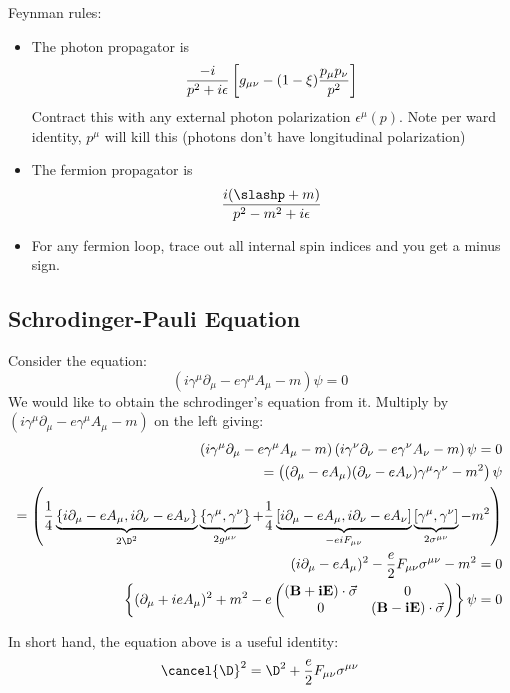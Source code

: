 \documentclass[11pt]{scrartcl}
\begin{document}
Feynman rules:
\begin{itemize}
\item The photon propagator is 
\[ {-i \over p^2 + i \epsilon} \left[g_{\mu \nu} - (1 - \xi){p_\mu p_\nu \over p^2} \right] \]
Contract this with any external photon polarization $ \epsilon^\mu(p)$.  Note per ward identity, $p^\mu$ will kill this (photons don't have longitudinal polarization)
\item The fermion propagator is
\[{i (\slashp + m) \over p^2 - m^2 + i \epsilon} \]
\item For any fermion loop, trace out all internal spin indices and you get a minus sign.
	\end{itemize}
\subsection{Schrodinger-Pauli Equation}
Consider the equation:
\[ \left(i \gamma^\mu \partial_\mu - e \gamma^\mu A_\mu - m\right) \psi = 0 \]
We would like to obtain the schrodinger's equation from it.
Multiply by $\left(i \gamma^\mu \partial_\mu - e \gamma^\mu A_\mu - m\right)$ on the left giving:
\begin{align}
\left(i \gamma^\mu \partial_\mu - e \gamma^\mu A_\mu - m\right) \left(i \gamma^\nu \partial_\nu - e \gamma^\nu A_\nu - m\right) \psi = 0 \\
 = \left((\partial_\mu - e A_\mu) (\partial_\nu - e A_\nu) \gamma^\mu \gamma^\nu - m^2 \right)  \psi \\
 = \left( \frac14 \underbrace{ \{ i \partial_\mu - e A_\mu, i\partial_\nu - e A_\nu \} }_{2 \D^2} \underbrace{\{\gamma^\mu, \gamma^\nu \}}_{2 g^{\mu \nu}}  + \frac14 \underbrace{[ i\partial_\mu - e A_\mu, i \partial_\nu - e A_\nu]}_{- ei F_{\mu \nu}} \underbrace{[\gamma^\mu, \gamma^\nu]}_{2 \sigma^{\mu \nu}} - m^2\right)  \\
 (i \partial_\mu - e A_\mu)^2 - {e \over 2} F_{\mu \nu} \sigma^{\mu \nu} - m^2 = 0 \\
 \left\{ (\partial_\mu + i e A_\mu)^2 + m^2 - e
 \begin{pmatrix}
 	(\mathbf{B + i E}) \cdot \vec{\sigma} & 0 \\
 	0 & (\mathbf{B - i E}) \cdot \vec{\sigma}
 	\end{pmatrix}  \right\} \psi = 0	
\end{align}

In short hand, the equation above is a useful identity:
\[ \cancel{\D}^2 = \D^2 + {e \over 2} F_{\mu \nu} \sigma^{\mu \nu} \]
\end{document}
